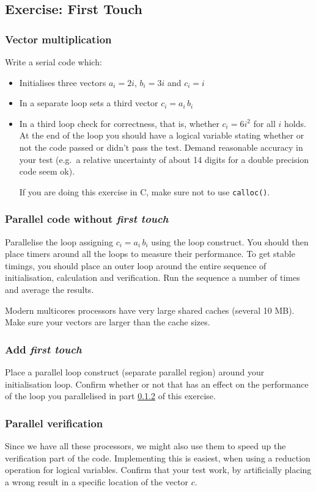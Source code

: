 \subsection{Exercise: First Touch}
\subsubsection{Vector multiplication}
Write a serial code which:
\begin{itemize}
\item	Initialises three vectors $a_i=2i$, $b_i=3i$ and $c_i = i$
\item	In a separate loop sets a third vector $c_i= a_i \, b_i$
\item	In a third loop check for correctness, that is, whether $c_i=6i^2$ for all $i$ holds.  
At the end of the loop you should have a logical variable stating whether or not the code passed or didn't pass the test.  Demand reasonable accuracy in your test (e.g.\ a relative uncertainty of about 14 digits for a double precision code seem ok).

If you are doing this exercise in C, make sure not to use \verb+calloc()+.
\end{itemize}
\subsubsection{Parallel code without \textit{first touch}}\label{noFirstTouch}
Parallelise the loop assigning $c_i = a_i \, b_i$ using the loop construct.  You should then place timers around all the loops to measure their performance.  To get stable timings, you should place an outer loop around the entire sequence of initialisation, calculation and verification.  Run the sequence a number of times and average the results.

Modern multicores processors have very large shared caches (several 10 MB).  Make sure your vectors are larger than the cache sizes.

\subsubsection{Add \textit{first touch}}
Place a parallel loop construct (separate parallel region) around your initialisation loop.  Confirm whether or not that has an effect on the performance of the loop you parallelised in part \ref{noFirstTouch} of this exercise.
\subsubsection{Parallel verification}
Since we have all these processors, we might also use them to speed up the verification part of the code.  Implementing this is easiest, when using a reduction operation for logical variables.  Confirm that your test work, by artificially placing a wrong result in a specific location of the vector $c$.